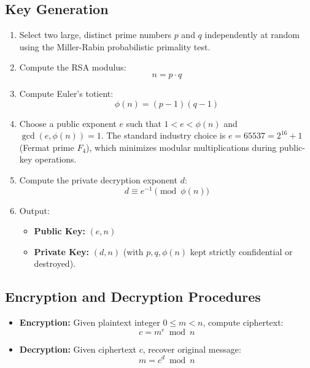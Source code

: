 \subsection{Key Generation}
\begin{enumerate}
    \item Select two large, distinct prime numbers $p$ and $q$ independently at random using the Miller-Rabin probabilistic primality test.
    \item Compute the RSA modulus:
    \begin{equation}
    n = p \cdot q
    \end{equation}
    \item Compute Euler's totient:
    \begin{equation}
    \phi(n) = (p - 1)(q - 1)
    \end{equation}
    \item Choose a public exponent $e$ such that $1 < e < \phi(n)$ and $\gcd(e, \phi(n)) = 1$. The standard industry choice is $e = 65537 = 2^{16} + 1$ (Fermat prime $F_4$), which minimizes modular multiplications during public-key operations.
    \item Compute the private decryption exponent $d$:
    \begin{equation}
    d \equiv e^{-1} \pmod{\phi(n)}
    \end{equation}
    \item Output:
    \begin{itemize}
        \item \textbf{Public Key:} $(e, n)$
        \item \textbf{Private Key:} $(d, n)$ (with $p, q, \phi(n)$ kept strictly confidential or destroyed).
    \end{itemize}
\end{enumerate}

\subsection{Encryption and Decryption Procedures}
\begin{itemize}
    \item \textbf{Encryption:} Given plaintext integer $0 \le m < n$, compute ciphertext:
    \begin{equation}
    c = m^e \bmod n
    \end{equation}
    \item \textbf{Decryption:} Given ciphertext $c$, recover original message:
    \begin{equation}
    m = c^d \bmod n
    \end{equation}
\end{itemize}

